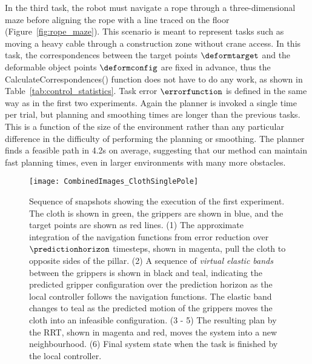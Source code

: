 In the third task, the robot must navigate a rope through a three-dimensional maze before aligning the rope with a line traced on the floor (Figure~\ref{fig:rope_maze}). This scenario is meant to represent tasks such as moving a heavy cable through a construction zone without crane access. In this task, the correspondences between the target points $\deformtarget$ and the deformable object points $\deformconfig$ are fixed in advance, thus the CalculateCorrespondences() function does not have to do any work, as shown in Table~\ref{tab:control_statistics}. Task error $\errorfunction$ is defined in the same way as in the first two experiments. Again the planner is invoked a single time per trial, but planning and smoothing times are longer than the previous tasks. This is a function of the size of the environment rather than any particular difference in the difficulty of performing the planning or smoothing. The planner finds a feasible path in 4.2s on average, suggesting that our method can maintain fast planning times, even in larger environments with many more obstacles.




\begin{figure*}[ht]
    \centering
    \texttt{[image: CombinedImages\_ClothSinglePole]}
    \vspace{-0.2in}
    \caption{Sequence of snapshots showing the execution of the first experiment. The cloth is shown in green, the grippers are shown in blue, and the target points are shown as red lines. (1) The approximate integration of the navigation functions from error reduction over $\predictionhorizon$ timesteps, shown in magenta, pull the cloth to opposite sides of the pillar. (2) A sequence of \textit{virtual elastic bands} between the grippers is shown in black and teal, indicating the predicted gripper configuration over the prediction horizon as the local controller follows the navigation functions. The elastic band changes to teal as the predicted motion of the grippers moves the cloth into an infeasible configuration. (3 - 5) The resulting plan by the RRT, shown in magenta and red, moves the system into a new neighbourhood. (6) Final system state when the task is finished by the local controller.}
    \label{fig:cloth_single_pole}
\end{figure*}


